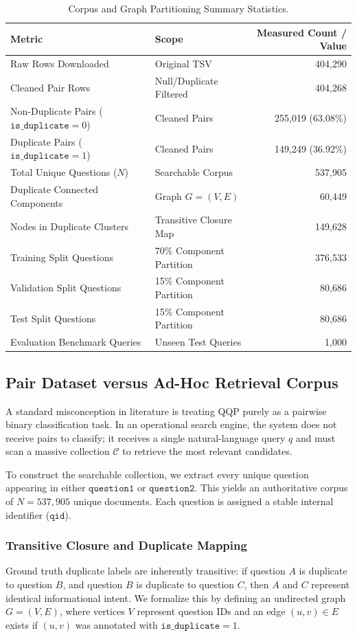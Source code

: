 \documentclass[11pt,a4paper]{article}
\begin{document}
\begin{table}[h]
\centering
\small
\caption{Corpus and Graph Partitioning Summary Statistics.}
\label{tab:dataset_summary}
\begin{tabular}{llr}
\toprule
\textbf{Metric} & \textbf{Scope} & \textbf{Measured Count / Value} \\
\midrule
Raw Rows Downloaded & Original TSV & 404,290 \\
Cleaned Pair Rows & Null/Duplicate Filtered & 404,268 \\
Non-Duplicate Pairs ($\mathtt{is\_duplicate}=0$) & Cleaned Pairs & 255,019 (63.08\%) \\
Duplicate Pairs ($\mathtt{is\_duplicate}=1$) & Cleaned Pairs & 149,249 (36.92\%) \\
\midrule
Total Unique Questions ($N$) & Searchable Corpus & 537,905 \\
Duplicate Connected Components & Graph $G=(V, E)$ & 60,449 \\
Nodes in Duplicate Clusters & Transitive Closure Map & 149,628 \\
\midrule
Training Split Questions & 70\% Component Partition & 376,533 \\
Validation Split Questions & 15\% Component Partition & 80,686 \\
Test Split Questions & 15\% Component Partition & 80,686 \\
Evaluation Benchmark Queries & Unseen Test Queries & 1,000 \\
\bottomrule
\end{tabular}
\end{table}

\subsection{Pair Dataset versus Ad-Hoc Retrieval Corpus}
A standard misconception in literature is treating QQP purely as a pairwise binary classification task. In an operational search engine, the system does not receive pairs to classify; it receives a single natural-language query $q$ and must scan a massive collection $\mathcal{C}$ to retrieve the most relevant candidates.

To construct the searchable collection, we extract every unique question appearing in either $\mathtt{question1}$ or $\mathtt{question2}$. This yields an authoritative corpus of $N = 537,905$ unique documents. Each question is assigned a stable internal identifier ($\mathtt{qid}$).

\subsubsection{Transitive Closure and Duplicate Mapping}
Ground truth duplicate labels are inherently transitive: if question $A$ is duplicate to question $B$, and question $B$ is duplicate to question $C$, then $A$ and $C$ represent identical informational intent. We formalize this by defining an undirected graph $G = (V, E)$, where vertices $V$ represent question IDs and an edge $(u, v) \in E$ exists if $(u, v)$ was annotated with $\mathtt{is\_duplicate} = 1$.
\end{document}
